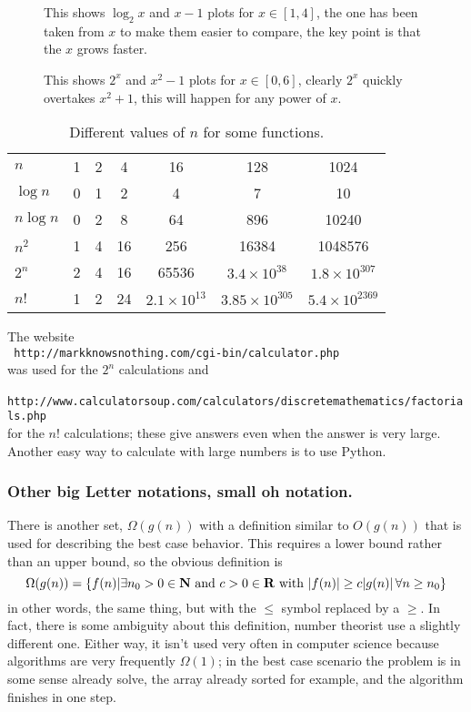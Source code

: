 \documentclass[11pt,a4paper]{scrartcl}
\begin{document}
\begin{figure}

\caption{This shows $\log_2{x}$ and $x-1$ plots for $x\in[1,4]$, the one has been taken from $x$ to make them easier to compare, the key point is that the $x$ grows faster.\label{fig_log}}
\end{figure}


\begin{figure}

\caption{This shows $2^x$ and $x^2-1$ plots for $x\in[0,6]$, clearly $2^x$ quickly overtakes $x^2+1$, this will happen for any power of $x$. \label{fig_log}}
\end{figure}

\begin{table}
\begin{tabular}{l|cccccc}
        $n$    &1   &2&4   &16  &128&1024\\
$\log{n}$      &0   &1&2   &4   &7  &10\\
$n\log{n}$     &0   &2&8   &64  &896&10240\\
$n^2$     &1   &4&16&256&16384&1048576\\
$2^n$     &2   &4&16&65536&$3.4\times 10^{38}$&$1.8\times 10^{307}$\\
$n!$      &1   &2&24&$2.1\times 10^{13}$&$3.85\times 10^{305}$&$5.4\times10^{2369}$
\end{tabular}
\vskip 1cm The website\\ {\tt
  http://markknowsnothing.com/cgi-bin/calculator.php}\\ was used for
the $2^n$ calculations and\\ {\tt
  http://www.calculatorsoup.com/calculators/discretemathematics/factorials.php}\\ for
the $n!$ calculations; these give answers even when the answer is very
large. Another easy way to calculate with large numbers is to use Python.

\caption{Different values of $n$ for some functions.  \label{table_n_values}
}
\end{table}

\subsubsection*{Other big Letter notations, small oh notation.}

There is another set, $\Omega(g(n))$ with a definition similar to
$O(g(n))$ that is used for describing the best case behavior. This
requires a lower bound rather than an upper bound, so the obvious
definition is
\begin{equation}
\Omega(g(n))=\{f(n)| \exists n_0>0\in {\bf N}\mbox{ and }c>0\in {\bf R}\mbox{ with }|f(n)|\ge c|g(n)|\,\forall n\ge n_0\}
\end{equation}
in other words, the same thing, but with the $\le$ symbol replaced by
a $\ge$. In fact, there is some ambiguity about this definition,
number theorist use a slightly different one. Either way, it isn't
used very often in computer science because algorithms are very
frequently $\Omega(1)$; in the best case scenario the problem is in
some sense already solve, the array already sorted for example, and
the algorithm finishes in one step. 
\end{document}
